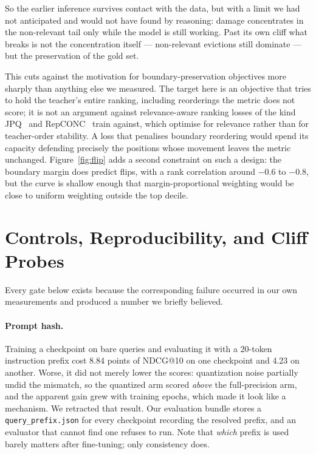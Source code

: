 \documentclass[11pt]{article}
\begin{document}
So the earlier inference survives contact with the data, but with a limit we had not
anticipated and would not have found by reasoning: damage concentrates in the non-relevant
tail only while the model is still working. Past its own cliff what breaks is not the
concentration itself --- non-relevant evictions still dominate --- but the preservation of the
gold set.

This cuts against the motivation for boundary-preservation objectives more sharply than
anything else we measured. The target here is an objective that tries to hold the teacher's
entire ranking, including reorderings the metric does not score; it is not an argument
against relevance-aware ranking losses of the kind JPQ~\cite{jpq} and RepCONC~\cite{repconc}
train against, which optimise for relevance rather than for teacher-order stability. A loss that penalises boundary reordering would spend its capacity
defending precisely the positions whose movement leaves the metric unchanged.
Figure~\ref{fig:flip} adds a second constraint on such a design: the boundary margin does
predict flips, with a rank correlation around $-0.6$ to $-0.8$, but the curve is shallow
enough that margin-proportional weighting would be close to uniform weighting outside the
top decile.

\FloatBarrier
\section{Controls, Reproducibility, and Cliff Probes}
\label{sec:repro}

Every gate below exists because the corresponding failure occurred in our own measurements
and produced a number we briefly believed.

\paragraph{Prompt hash.} Training a checkpoint on bare queries and evaluating it with a
20-token instruction prefix cost 8.84 points of NDCG@10 on one checkpoint and 4.23 on
another. Worse, it did not merely lower the scores: quantization noise partially undid the
mismatch, so the quantized arm scored \emph{above} the full-precision arm, and the apparent
gain grew with training epochs, which made it look like a mechanism. We retracted that
result. Our evaluation bundle stores a \texttt{query\_prefix.json} for every checkpoint recording the resolved
prefix, and an evaluator that cannot find one refuses to run. Note that \emph{which} prefix
is used barely matters after fine-tuning; only consistency does.
\end{document}
